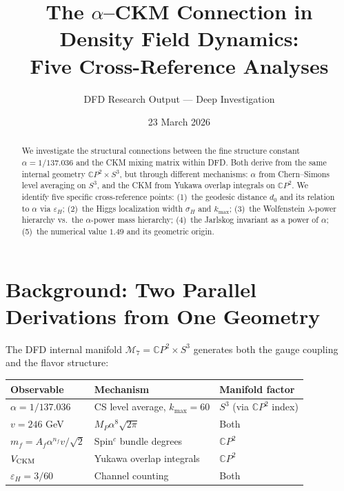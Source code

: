 \documentclass[11pt]{article}
\title{The $\alpha$--CKM Connection in Density Field Dynamics:\\
Five Cross-Reference Analyses}
\author{DFD Research Output --- Deep Investigation}
\date{23 March 2026}
\newcommand{\CP}{\mathbb{C}P}
\theoremstyle{remark}
\begin{document}
\maketitle

\begin{abstract}
We investigate the structural connections between the fine structure
constant $\alpha = 1/137.036$ and the CKM mixing matrix within DFD.
Both derive from the same internal geometry $\CP^2 \times S^3$, but
through different mechanisms: $\alpha$ from Chern--Simons level averaging
on $S^3$, and the CKM from Yukawa overlap integrals on $\CP^2$.
We identify five specific cross-reference points: (1)~the geodesic
distance $d_0$ and its relation to $\alpha$ via $\varepsilon_H$;
(2)~the Higgs localization width $\sigma_H$ and $k_{\max}$;
(3)~the Wolfenstein $\lambda$-power hierarchy vs.\ the $\alpha$-power
mass hierarchy; (4)~the Jarlskog invariant as a power of $\alpha$;
(5)~the numerical value $1.49$ and its geometric origin.
\end{abstract}

\tableofcontents
\newpage

\section{Background: Two Parallel Derivations from One Geometry}

The DFD internal manifold $\mathcal{M}_7 = \CP^2 \times S^3$ generates
both the gauge coupling and the flavor structure:

\begin{center}
\begin{tabular}{lll}
\toprule
\textbf{Observable} & \textbf{Mechanism} & \textbf{Manifold factor} \\
\midrule
$\alpha = 1/137.036$ & CS level average, $k_{\max}=60$ & $S^3$ (via $\CP^2$ index) \\
$v = 246$ GeV & $M_P \alpha^8 \sqrt{2\pi}$ & Both \\
$m_f = A_f \alpha^{n_f} v/\sqrt{2}$ & Spin$^c$ bundle degrees & $\CP^2$ \\
$V_{\rm CKM}$ & Yukawa overlap integrals & $\CP^2$ \\
$\varepsilon_H = 3/60$ & Channel counting & Both \\
\bottomrule
\end{tabular}
\end{center}
\end{document}
